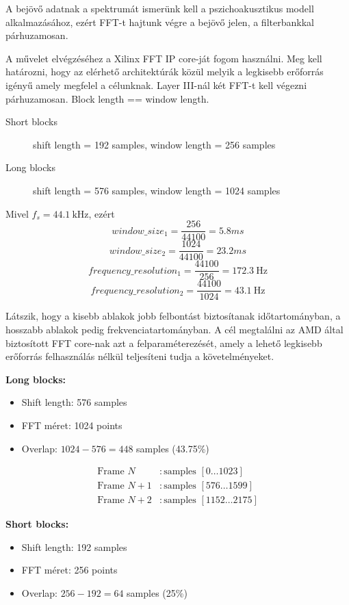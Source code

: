 \documentclass[12pt, a4paper]{article}
\begin{document}
A bejövő adatnak a spektrumát ismerünk kell a pszichoakusztikus modell alkalmazásához, ezért FFT-t hajtunk végre a bejövő jelen, a filterbankkal párhuzamosan.

A művelet elvégzéséhez a Xilinx FFT IP core-ját fogom használni. Meg kell határozni, hogy az elérhető architektúrák közül melyik a legkisebb erőforrás igényű amely megfelel a célunknak. Layer III-nál két FFT-t kell végezni párhuzamosan. Block length == window length.
\begin{description}
  \item[Short blocks] shift length = 192 samples, window length  = 256 samples
  \item[Long blocks] shift length = 576 samples, window length  = 1024 samples
\end{description}

Mivel \(f_s = \SI{44.1}{\kilo\hertz} \), ezért \[window\_size_1 = \frac{256}{44100} = 5.8 ms\] \[window\_size_2 = \frac{1024}{44100} = 23.2 ms\]
\[frequency\_resolution_1 = \frac{44100}{256} = \SI{172.3}{\hertz} \] \[frequency\_resolution_2 = \frac{44100}{1024} = \SI{43.1}{\hertz} \]

Látszik, hogy a kisebb ablakok jobb felbontást biztosítanak időtartományban, a hosszabb ablakok pedig frekvenciatartományban. A cél megtalálni az AMD által biztosított FFT core-nak azt a felparaméterezését, amely a lehető legkisebb erőforrás felhasználás nélkül teljesíteni tudja a követelményeket.

\textbf{Long blocks:}
\begin{itemize}
    \item Shift length: 576 samples
    \item FFT méret: 1024 points
    \item Overlap: $1024 - 576 = 448$ samples (43.75\%)
\end{itemize}

\begin{align*}
    \text{Frame } N   &: \text{samples } [0 \dots 1023] \\
    \text{Frame } N+1 &: \text{samples } [576 \dots 1599] \\
    \text{Frame } N+2 &: \text{samples } [1152 \dots 2175]
\end{align*}

\newpage

\textbf{Short blocks:}
\begin{itemize}
    \item Shift length: 192 samples
    \item FFT méret: 256 points
    \item Overlap: $256 - 192 = 64$ samples (25\%)
\end{itemize}
\end{document}
